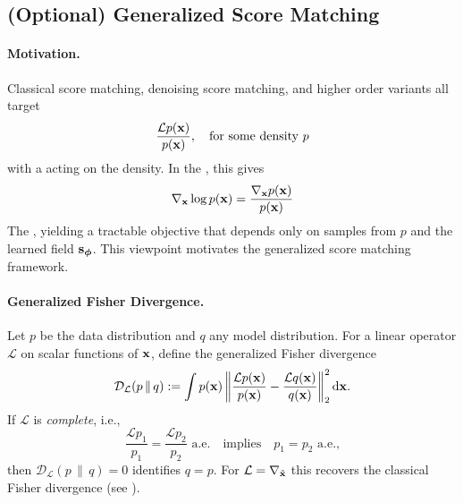 \subsection{(Optional) Generalized Score Matching}


\paragraph{Motivation.}
Classical score matching, denoising score matching, and higher order variants all target
\[
\frac{\mathcal L p({\mathbf{x}})}{p({\mathbf{x}})},\quad\text{for some density } p
\]
with a  acting on the density. 
In the , this gives 
\[
\nabla_{{\mathbf{x}}}\log p({\mathbf{x}}) = \frac{\nabla_{{\mathbf{x}}} p({\mathbf{x}})}{p({\mathbf{x}})}
\]
The , yielding a tractable objective that depends only on samples from $p$ and the learned field ${\mathbf{s}}_{\bm{\phi}}$. 
This viewpoint motivates the generalized score matching framework.

\paragraph{Generalized Fisher Divergence.}
Let $p$ be the data distribution and $q$ any model distribution.
For a linear operator $\mathcal L$ on scalar functions of ${\mathbf{x}}$, define the generalized Fisher divergence
\[
\mathcal D_{\mathcal L}(p \,\|\, q)
:= \int p({\mathbf{x}}) 
\left\|
\frac{\mathcal L p({\mathbf{x}})}{p({\mathbf{x}})}
-
\frac{\mathcal L q({\mathbf{x}})}{q({\mathbf{x}})}
\right\|_2^2 \mathop{}\!\mathrm{d} {\mathbf{x}}.
\]
If $\mathcal L$ is \emph{complete}, i.e., 
\[
\frac{\mathcal L p_1}{p_1}=\frac{\mathcal L p_2}{p_2} \text{ a.e.}\quad \text{implies}\quad p_1=p_2 \text{ a.e.,}
\]
then $\mathcal D_{\mathcal L}(p \,\|\, q)=0$ identifies $q=p$.
For $\mathcal L=\nabla_{\tilde{{\mathbf{x}}}}$ this recovers the classical Fisher divergence (see ).

